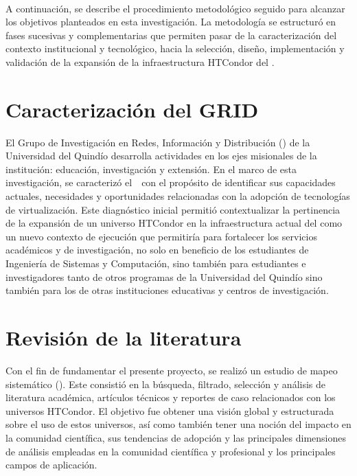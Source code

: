 \label{cap:desarrolloMetodologico}
\mbox{}\\
\noindent
A continuación, se describe el procedimiento metodológico seguido para alcanzar los objetivos planteados en esta investigación. La metodología se estructuró en fases sucesivas y complementarias que permiten pasar de la caracterización del contexto institucional y tecnológico, hacia la selección, diseño, implementación y validación de la expansión de la infraestructura HTCondor del \GRID.

\section{Caracterización del GRID}
\noindent
El Grupo de Investigación en Redes, Información y Distribución (\GRID) de la Universidad del Quindío desarrolla actividades en los ejes misionales de la institución: educación, investigación y extensión. En el marco de esta investigación, se caracterizó el~\GRID~con el propósito de identificar sus capacidades actuales, necesidades y oportunidades relacionadas con la adopción de tecnologías de virtualización. Este diagnóstico inicial permitió contextualizar la pertinencia de la expansión de un universo HTCondor en la infraestructura actual del \GRID como un nuevo contexto de ejecución que permitiría para fortalecer los servicios académicos y de investigación, no solo en beneficio de los estudiantes de Ingeniería de Sistemas y Computación, sino también para estudiantes e investigadores tanto de otros programas de la Universidad del Quindío sino también para los de otras instituciones educativas y centros de investigación.


\section{Revisión de la literatura}
\noindent
Con el fin de fundamentar el presente proyecto, se realizó un estudio de mapeo sistemático (\SMS). Este consistió en la búsqueda, filtrado, selección y análisis de literatura académica, artículos técnicos y reportes de caso relacionados con los universos HTCondor. El objetivo fue obtener una visión global y estructurada sobre el uso de estos universos, así como también tener una noción del impacto en la comunidad científica, sus tendencias de adopción y las principales dimensiones de análisis empleadas en la comunidad científica y profesional y los principales campos de aplicación.

